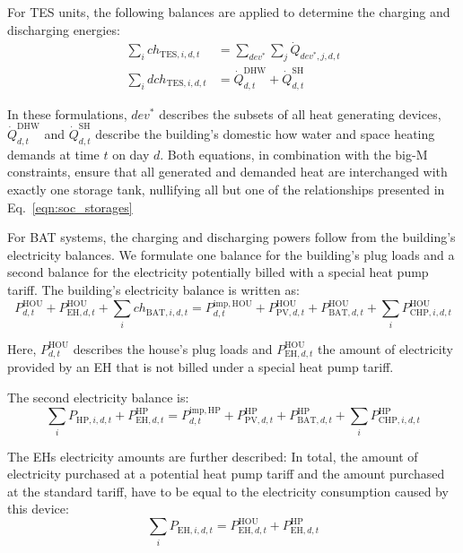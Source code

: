 For TES units, the following balances are applied to determine the charging and discharging energies:
\begin{align}
	\sum\limits_{i} ch_{\mathrm{TES,}i,d,t} &= \sum\limits_{dev^*} \sum\limits_{j} \dot{Q}_{dev^*,j,d,t}\\
	\sum\limits_{i} dch_{\mathrm{TES,}i,d,t} &= \dot{Q}^\mathrm{DHW}_{d,t} + \dot{Q}^\mathrm{SH}_{d,t}
\end{align}

In these formulations, $dev^*$ describes the subsets of all heat generating devices, $\dot{Q}^\mathrm{DHW}_{d,t}$ and $\dot{Q}^\mathrm{SH}_{d,t}$ describe the building's domestic how water and space heating demands at time $t$ on day $d$.
Both equations, in combination with the big-M constraints, ensure that all generated and demanded heat are interchanged with exactly one storage tank, nullifying all but one of the relationships presented in Eq.~\ref{eqn:soc_storages}

For BAT systems, the charging and discharging powers follow from the building's electricity balances.
We formulate one balance for the building's plug loads and a second balance for the electricity potentially billed with a special heat pump tariff.
The building's electricity balance is written as:
\begin{equation}
	P^\mathrm{HOU}_{d,t} + P^\mathrm{HOU}_{\mathrm{EH,}d,t} + \sum\limits_{i} ch_{\mathrm{BAT,}i,d,t} = P^\mathrm{imp,HOU}_{d,t} + P^\mathrm{HOU}_{\mathrm{PV,}d,t} + P^\mathrm{HOU}_{\mathrm{BAT,}d,t} + \sum\limits_{i} P^\mathrm{HOU}_{\mathrm{CHP,}i,d,t}
\end{equation}

Here, $P^\mathrm{HOU}_{d,t}$ describes the house's plug loads and $P^\mathrm{HOU}_{\mathrm{EH,}d,t}$ the amount of electricity provided by an EH that is not billed under a special heat pump tariff.

The second electricity balance is:
\begin{equation}
	\sum\limits_{i} P_{\mathrm{HP,}i,d,t} + P^\mathrm{HP}_{\mathrm{EH,}d,t} = P^\mathrm{imp,HP}_{d,t} + P^\mathrm{HP}_{\mathrm{PV,}d,t} + P^\mathrm{HP}_{\mathrm{BAT,}d,t} + \sum\limits_{i} P^\mathrm{HP}_{\mathrm{CHP,}i,d,t}
\end{equation}

The EHs electricity amounts are further described:
In total, the amount of electricity purchased at a potential heat pump tariff and the amount purchased at the standard tariff, have to be equal to the electricity consumption caused by this device:
\begin{equation}
	\sum\limits_{i} P_{\mathrm{EH,}i,d,t} = P^\mathrm{HOU}_{\mathrm{EH,}d,t} + P^\mathrm{HP}_{\mathrm{EH,}d,t}
\end{equation}

